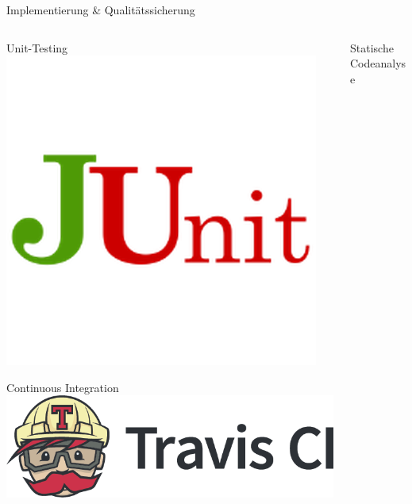 \documentclass[xcolor=dvipsnames]{beamer}
\begin{document}
    \begin{frame}{Implementierung \& Qualitätssicherung}
        \begin{columns}
            \begin{column}{0.5\textwidth}
                \begin{block}{Unit-Testing}
                    \center
                    \includegraphics[width=(\textwidth)]{img/junit} %
                \end{block}
                \begin{block}{Continuous Integration}
                    \includegraphics[width=\textwidth]{img/travis.png}
                \end{block}
            \end{column}
            \begin{column}{0.5\textwidth}
                \begin{block}{Statische Codeanalyse}
                    \center

\end{block}
\end{column}
\end{columns}
\end{frame}
\end{document}
